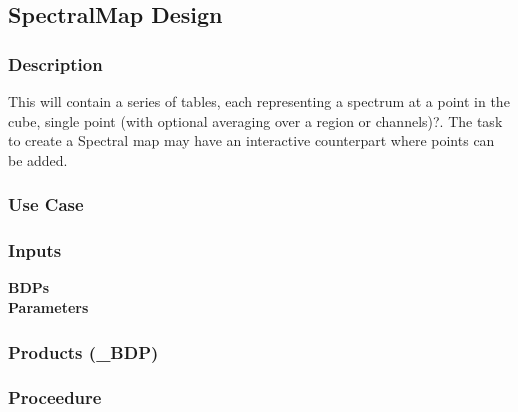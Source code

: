 \subsection{SpectralMap Design}

\subsubsection{Description}
This will contain a series of tables, each representing a spectrum at a
point in the cube, single point (with optional averaging over a region
or channels)?.  The task to create a Spectral map may have an interactive 
counterpart where points can be added.

\subsubsection{Use Case}


\subsubsection{Inputs}
{\bf BDPs}\\

{\bf Parameters}\\
\begin{description}
\item[]
\end{description}

\subsubsection{Products (\_BDP)}


\subsubsection{Proceedure}
\clearpage
